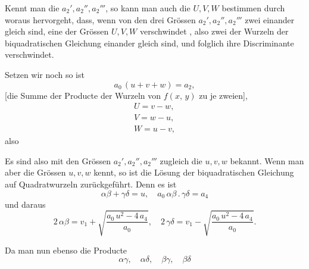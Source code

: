 
Kennt man die $a_2', a_2'', a_2'''$, so kann man auch die $U, V, W$
bestimmen durch
woraus hervorgeht, dass, wenn von den drei Grössen $a_2', a_2'', a_2'''$
zwei einander gleich sind, eine der Grössen $U, V, W$ verschwindet
, also zwei der Wurzeln der biquadratischen Gleichung
einander gleich sind, und folglich ihre Discriminante verschwindet.

Setzen wir noch
so ist
\[
a_0\,(u + v + w) = a_2,
\]
[die Summe der Producte der Wurzeln von $f(x,\,y)$ zu je zweien],
\[
\begin{gathered}
U = v - w,\\
V = w - u,\\
W = u - v,
\end{gathered}
\]
also

Es sind also mit den Grössen $a_2', a_2'', a_2'''$ zugleich die $u, v, w$
bekannt. Wenn man aber die Grössen $u, v, w$ kennt, so ist
die Lösung der biquadratischen Gleichung auf Quadratwurzeln
zurückgeführt. Denn es ist
\[
\alpha\beta + \gamma\delta = u, \quad a_0\,\alpha\beta\,.\,\gamma\delta = a_4
\]
und daraus
\[
2\,\alpha\beta = v_1 + \sqrt{\frac{a_0\,u^2 - 4\,a_4}{a_0}}, \quad
2\,\gamma\delta = v_1 - \sqrt{\frac{a_0\,u^2 - 4\,a_4}{a_0}}.
\]

Da man nun ebenso die Producte
\[
\alpha\gamma, \quad \alpha\delta, \quad \beta\gamma, \quad \beta\delta
\]
